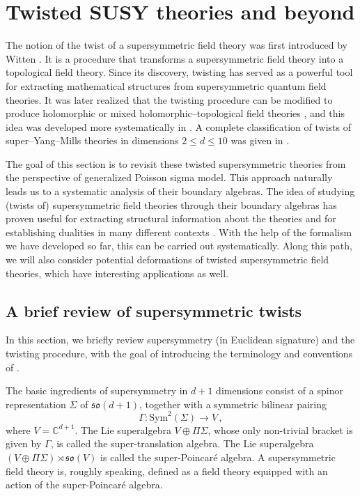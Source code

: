 \documentclass[11pt]{article}
\newcommand{\C}{\mathbb{C}}
\numberwithin{equation}{section}
\begin{document}
\section{Twisted SUSY theories and beyond}
\label{sec:SUSYtwist}
The notion of the twist of a supersymmetric field theory was first introduced by Witten \cite{Witten:1988xj,Witten:1988ze}. It is a procedure that transforms a supersymmetric field theory into a topological field theory. Since its discovery, twisting has served as a powerful tool for extracting mathematical structures from supersymmetric quantum field theories. It was later realized that the twisting procedure can be modified to produce holomorphic \cite{Johansen:1994aw} or mixed holomorphic–topological field theories \cite{kapustin2006holomorphic}, and this idea was developed more systematically in \cite{costello2013notes}. A complete classification of twists of super–Yang–Mills theories in dimensions $2 \leq d \leq 10$ was given in \cite{Elliott:2020ecf}.

The goal of this section is to revisit these twisted supersymmetric theories from the perspective of generalized Poisson sigma model. This approach naturally leads us to a systematic analysis of their boundary algebras. The idea of studying (twists of) supersymmetric field theories through their boundary algebras has proven useful for extracting structural information about the theories and for establishing dualities in many different contexts \cite{gaiotto2009s, dimofte2018dual, costello2019vertex, costello2019higgs, zeng2023monopole}. With the help of the formalism we have developed so far, this can be carried out systematically. Along this path, we will also consider potential deformations of twisted supersymmetric field theories, which have interesting applications as well.
 
\subsection{A brief review of supersymmetric twists}
In this section, we briefly review supersymmetry (in Euclidean signature) and the twisting procedure, with the goal of introducing the terminology and conventions of \cite{Elliott:2020ecf}.

The basic ingredients of supersymmetry in $d+1$ dimensions consist of a spinor representation $\Sigma$ of $\mathfrak{so}(d+1)$, together with a symmetric bilinear pairing
\begin{equation}
	\Gamma: \mathrm{Sym}^2(\Sigma) \to V\,,
\end{equation}
where $V = \C^{d+1}$. The Lie superalgebra $V\oplus \Pi \Sigma$, whose only non-trivial bracket is given by $\Gamma$, is called the super-translation algebra. The Lie superalgebra $(V\oplus \Pi \Sigma)\rtimes \mathfrak{so}(V)$ is called the super-Poincar\'{e} algebra. A supersymmetric field theory is, roughly speaking, defined as a field theory equipped with an action of the super-Poincar\'{e} algebra.
\end{document}
